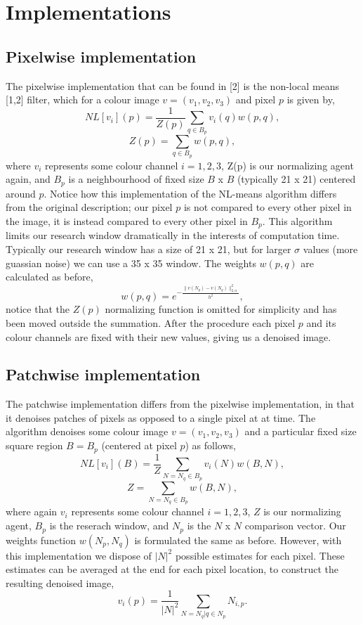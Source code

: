 \documentclass[11pt, twocolumn]{article}
\begin{document}
\section{Implementations}
\subsection{Pixelwise implementation}
The pixelwise implementation that can be found in [2] is the non-local means [1,2] filter, which for a colour image $v = (v_1,v_2,v_3)$ and pixel $p$ is given by,
$$NL[v_i](p) = \frac{1}{Z(p)} \sum_{q \in B_{p}} v_i(q)w(p,q),$$
$$Z(p) = \sum_{q \in B_{p}}w(p,q),$$
where $v_i$ represents some colour channel $i = 1, 2, 3$, Z(p) is our normalizing agent again, and $B_p$ is a neighbourhood of fixed size $B$ x $B$ (typically 21 x 21) centered around $p$. Notice how this implementation of the NL-means algorithm differs from the original description; our pixel $p$ is not compared to every other pixel in the image, it is instead compared to every other pixel in $B_p$. This algorithm limits our research window dramatically in the interests of computation time. Typically our research window has a size of 21 x 21, but for larger $\sigma$ values (more guassian noise) we can use a 35 x 35 window. The weights $w(p,q)$ are calculated as before,
$$w(p,q) =  e^{-\frac{\parallel v(N_{p}) - v(N_{q}) \parallel_{2, \alpha}^{2}}{h^2}},$$
notice that the $Z(p)$ normalizing function is omitted for simplicity and has been moved outside the summation. After the procedure each pixel $p$ and its colour channels are fixed with their new values, giving us a denoised image.
\subsection{Patchwise implementation}
The patchwise implementation differs from the pixelwise implementation, in that it denoises patches of pixels as opposed to a single pixel at at time. The algorithm denoises some colour image $v = (v_1, v_2, v_3)$ and a particular fixed size square region $B = B_p$ (centered at pixel $p$) as follows,
$$NL[v_i](B) = \frac{1}{Z} \sum_{N = N_q \in B_p} v_i(N)w(B, N),$$
$$ Z = \sum_{N = N_q \in B_p} w(B, N), $$
where again $v_i$ represents some colour channel $i = 1, 2, 3$, $Z$ is our normalizing agent, $B_p$ is the reserach window, and $N_p$ is the $N$ x $N$ comparison vector. Our weights function $w(N_p, N_q)$ is formulated the same as before. However, with this implementation we dispose of $|N|^2$ possible estimates for each pixel. These estimates can be averaged at the end for each pixel location, to construct the resulting denoised image,
$$v_i(p) = \frac{1}{|N|^2} \sum_{N=N_q | q \in N_p}N_{i,p}.$$
\end{document}

